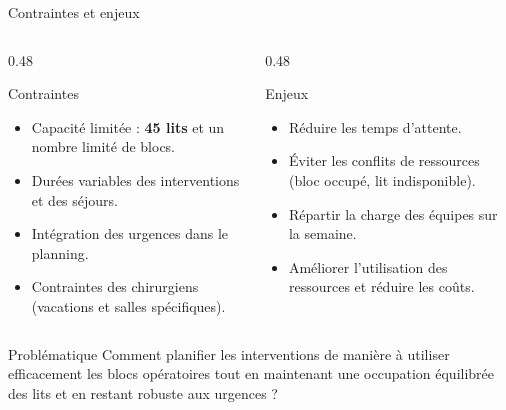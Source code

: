 \begin{frame}{Contraintes et enjeux}

  \begin{columns}[T]

    \begin{column}{0.48\textwidth}

      \begin{block}{Contraintes}
        \begin{itemize}
          \item Capacité limitée : \textbf{45 lits} et un nombre limité de blocs.
          \item Durées variables des interventions et des séjours.
          \item Intégration des urgences dans le planning.
          \item Contraintes des chirurgiens (vacations et salles spécifiques).
        \end{itemize}
      \end{block}

    \end{column}

    \begin{column}{0.48\textwidth}

      \begin{block}{Enjeux}
        \begin{itemize}
          \item Réduire les temps d'attente.
          \item Éviter les conflits de ressources (bloc occupé, lit indisponible).
          \item Répartir la charge des équipes sur la semaine.
          \item Améliorer l'utilisation des ressources et réduire les coûts.
        \end{itemize}
      \end{block}

    \end{column}

  \end{columns}

  \vspace{0.4em}

  \begin{alertblock}{Problématique}
    Comment planifier les interventions de manière à utiliser efficacement les blocs opératoires tout en maintenant une occupation équilibrée des lits et en restant robuste aux urgences ?
  \end{alertblock}

\end{frame}